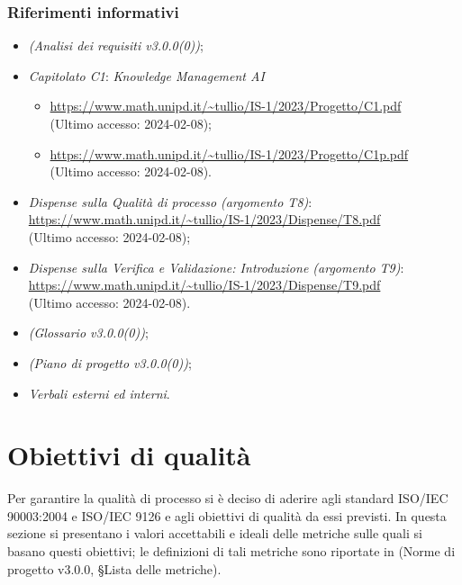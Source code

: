 \documentclass[10pt, a4paper]{article}
\begin{document}
    \subsubsection{Riferimenti informativi}
    \begin{itemize}
        \item \textit{(Analisi dei requisiti v3.0.0(0))};
        \item \textit{Capitolato C1}: \textit{Knowledge Management AI}
        \begin{itemize}
            \item \url{https://www.math.unipd.it/~tullio/IS-1/2023/Progetto/C1.pdf}\\
            (Ultimo accesso: 2024-02-08);
            \item \url{https://www.math.unipd.it/~tullio/IS-1/2023/Progetto/C1p.pdf}\\
            (Ultimo accesso: 2024-02-08).
        \end{itemize}
        \item \textit{Dispense sulla Qualità di processo (argomento T8)}: \\
            \url{https://www.math.unipd.it/~tullio/IS-1/2023/Dispense/T8.pdf}\\
            (Ultimo accesso: 2024-02-08);
        \item \textit{Dispense sulla Verifica e Validazione: Introduzione (argomento T9)}: \\
            \url{https://www.math.unipd.it/~tullio/IS-1/2023/Dispense/T9.pdf}\\
            (Ultimo accesso: 2024-02-08).
        \item \textit{(Glossario v3.0.0(0))};
        \item \textit{(Piano di progetto v3.0.0(0))};
        \item \textit{Verbali esterni ed interni}.
    \end{itemize}

    
\newpage
\section{Obiettivi di qualità}
\label{ObiettiviQualità}
Per garantire la qualità di processo si è deciso di aderire agli standard ISO/IEC 90003:2004 e ISO/IEC 9126 e agli obiettivi di qualità da essi previsti. In questa sezione si presentano i valori accettabili e ideali delle metriche sulle quali si basano questi obiettivi; le definizioni di tali metriche sono riportate in (Norme di progetto v3.0.0, \S Lista delle metriche).
\end{document}
